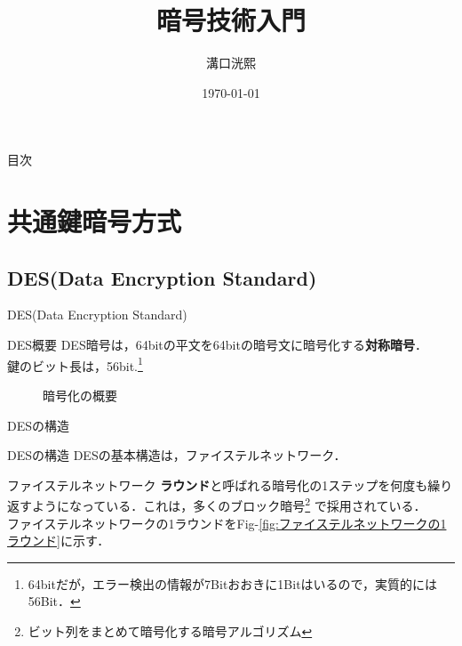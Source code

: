 \documentclass[dvipdfmx]{beamer}
\title[暗号技術入門]{暗号技術入門}
\author[K.MIZOGUCHI]{溝口洸熙}
\date{\today}
\institute[KUT]{高知工科大学 情報学群}
\newcommand{\figref}[1]{Fig\thesection-\ref{#1}}
\begin{document}
\begin{frame}
\titlepage
\end{frame}
\begin{frame}{目次}
    \tableofcontents
\end{frame}

\section{共通鍵暗号方式}
\subsection{DES(Data Encryption Standard)}
\begin{frame}{DES(Data Encryption Standard)}
    \begin{block}{DES概要}
        DES暗号は，64bitの平文を64bitの暗号文に暗号化する\textbf{対称暗号}．\\
        鍵のビット長は，56bit.\footnote{64bitだが，エラー検出の情報が7Bitおおきに1Bitはいるので，実質的には56Bit．}
    \end{block}
    \begin{figure}[b]
        \centering
        \caption{暗号化の概要}
        \label{fig:暗号化の概要}
        
    \end{figure}
\end{frame}
\begin{frame}{DESの構造}
    \begin{block}{DESの構造}
        DESの基本構造は，ファイステルネットワーク．
    \end{block}
    \begin{block}{ファイステルネットワーク}
        \textbf{ラウンド}と呼ばれる暗号化の1ステップを何度も繰り返すようになっている．これは，多くのブロック暗号\footnote{ビット列をまとめて暗号化する暗号アルゴリズム} で採用されている．\\
        ファイステルネットワークの1ラウンドを\figref{fig:ファイステルネットワークの1ラウンド}に示す．
    \end{block}
\end{frame}
\end{document}
